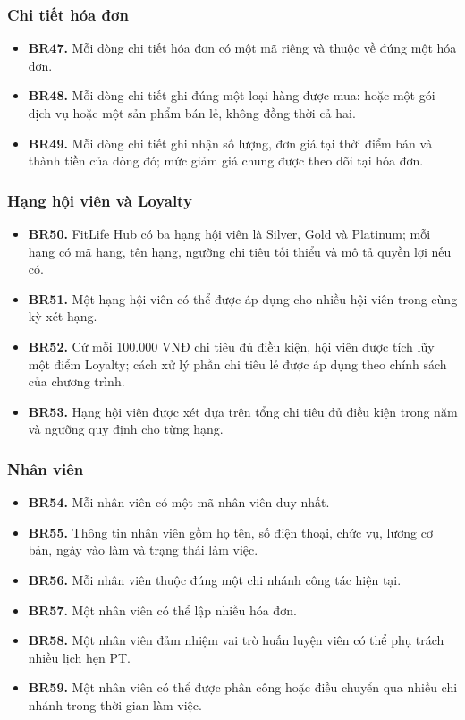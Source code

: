 \documentclass[11pt, a4paper]{article}
\begin{document}
\subsubsection{Chi tiết hóa đơn}
\begin{itemize}
    \item \textbf{BR47.} Mỗi dòng chi tiết hóa đơn có một mã riêng và thuộc về đúng một hóa đơn.
    \item \textbf{BR48.} Mỗi dòng chi tiết ghi đúng một loại hàng được mua: hoặc một gói dịch vụ hoặc một sản phẩm bán lẻ, không đồng thời cả hai.
    \item \textbf{BR49.} Mỗi dòng chi tiết ghi nhận số lượng, đơn giá tại thời điểm bán và thành tiền của dòng đó; mức giảm giá chung được theo dõi tại hóa đơn.
\end{itemize}

\subsubsection{Hạng hội viên và Loyalty}
\begin{itemize}
    \item \textbf{BR50.} FitLife Hub có ba hạng hội viên là Silver, Gold và Platinum; mỗi hạng có mã hạng, tên hạng, ngưỡng chi tiêu tối thiểu và mô tả quyền lợi nếu có.
    \item \textbf{BR51.} Một hạng hội viên có thể được áp dụng cho nhiều hội viên trong cùng kỳ xét hạng.
    \item \textbf{BR52.} Cứ mỗi 100.000 VNĐ chi tiêu đủ điều kiện, hội viên được tích lũy một điểm Loyalty; cách xử lý phần chi tiêu lẻ được áp dụng theo chính sách của chương trình.
    \item \textbf{BR53.} Hạng hội viên được xét dựa trên tổng chi tiêu đủ điều kiện trong năm và ngưỡng quy định cho từng hạng.
\end{itemize}

\subsubsection{Nhân viên}
\begin{itemize}
    \item \textbf{BR54.} Mỗi nhân viên có một mã nhân viên duy nhất.
    \item \textbf{BR55.} Thông tin nhân viên gồm họ tên, số điện thoại, chức vụ, lương cơ bản, ngày vào làm và trạng thái làm việc.
    \item \textbf{BR56.} Mỗi nhân viên thuộc đúng một chi nhánh công tác hiện tại.
    \item \textbf{BR57.} Một nhân viên có thể lập nhiều hóa đơn.
    \item \textbf{BR58.} Một nhân viên đảm nhiệm vai trò huấn luyện viên có thể phụ trách nhiều lịch hẹn PT.
    \item \textbf{BR59.} Một nhân viên có thể được phân công hoặc điều chuyển qua nhiều chi nhánh trong thời gian làm việc.
\end{itemize}
\end{document}
